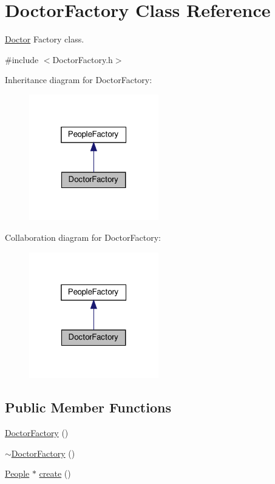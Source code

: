 \hypertarget{classDoctorFactory}{}\section{Doctor\+Factory Class Reference}
\label{classDoctorFactory}


\hyperlink{classDoctor}{Doctor} Factory class.  




{\ttfamily \#include $<$Doctor\+Factory.\+h$>$}



Inheritance diagram for Doctor\+Factory\+:\nopagebreak
\begin{figure}[H]
\begin{center}
\leavevmode
\includegraphics[width=160pt]{classDoctorFactory__inherit__graph}
\end{center}
\end{figure}


Collaboration diagram for Doctor\+Factory\+:\nopagebreak
\begin{figure}[H]
\begin{center}
\leavevmode
\includegraphics[width=160pt]{classDoctorFactory__coll__graph}
\end{center}
\end{figure}
\subsection*{Public Member Functions}
\begin{DoxyCompactItemize}
\item 
\hyperlink{classDoctorFactory_aadc371102a234a3a86f46e029f6cf6fe}{Doctor\+Factory} ()
\item 
\hyperlink{classDoctorFactory_a3f2ed2a1a4378d3490c0412645f70767}{$\sim$\+Doctor\+Factory} ()
\item 
\hyperlink{classPeople}{People} $\ast$ \hyperlink{classDoctorFactory_ab63193e85abefc65e13ba1c528a0d675}{create} ()
\end{DoxyCompactItemize}


